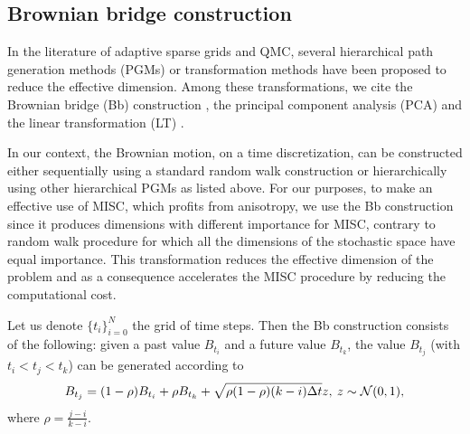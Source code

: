 \FloatBarrier

%



\subsection{Brownian bridge construction}\label{sec:Brwonian bridge construction}
In the literature of adaptive sparse grids and  QMC, several hierarchical path generation methods (PGMs) or transformation methods have been proposed to reduce the effective dimension. Among these transformations, we cite  the Brownian
bridge (Bb)  construction \cite{morokoff1994quasi,moskowitz1996smoothness,caflisch1997valuation}, the principal component analysis (PCA)  \cite{acworth1998comparison} and the linear transformation (LT) \cite{imai2004minimizing}.

In our context, the Brownian motion, on a time discretization, can be constructed either sequentially using a standard random walk construction or hierarchically using   other hierarchical PGMs as listed above. For our purposes, to make an effective use of MISC, which profits from anisotropy, we use the Bb construction since it produces  dimensions with different importance for MISC, contrary to random walk procedure for which all the dimensions of the stochastic space have equal importance.  This transformation  reduces the effective dimension  of the problem and as a consequence accelerates the MISC procedure by reducing the computational cost.

Let us denote $\{t_i\}_{i=0}^{N}$ the grid of time steps. Then the Bb construction \cite{glasserman2004monte} consists of the following: given a past value $B_{t_i}$ and a future value $B_{t_k}$, the value $B_{t_j}$ (with $t_i < t_j < t_k$) can be generated according to 
\begin{equation}
B_{t_j}=(1-\rho) B_{t_i}+\rho B_{t_k}+ \sqrt{\rho (1-\rho)(k-i) \Delta t} z, \: z \sim \mathcal{N}(0,1) ,
\end{equation}
where $\rho=\frac{j-i}{k-i}$.  


